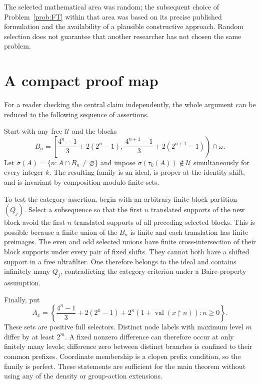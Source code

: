 \documentclass[11pt,a4paper]{article}
\theoremstyle{definition}
\theoremstyle{remark}
\newcommand{\U}{\mathcal U}
\newcommand{\supp}{\sigma}
\newcommand{\sh}[2]{\tau_{#1}(#2)}
\newcommand{\restr}{\mathbin{\upharpoonright}}
\DeclareMathOperator{\val}{val}
\begin{document}
The selected mathematical area was random; the subsequent choice of
Problem~\ref{prob:FT} within that area was based on its precise published
formulation and the availability of a plausible constructive approach.
Random selection does not guarantee that another researcher has not
chosen the same problem.

\section{A compact proof map}
\label{app:proofmap}
For a reader checking the central claim independently, the whole
argument can be reduced to the following sequence of assertions.

Start with any free $\U$ and the blocks
\[
 B_n=\left[\frac{4^n-1}{3}+2(2^n-1),\,
              \frac{4^{n+1}-1}{3}+2(2^{n+1}-1)\right)\cap\omega.
\]
Let $\supp(A)=\{n:A\cap B_n\ne\varnothing\}$ and impose
$\supp(\sh{k}{A})\notin\U$ simultaneously for every integer $k$.
The resulting family is an ideal, is proper at the identity shift,
and is invariant by composition modulo finite sets.

To test the category assertion, begin with an arbitrary finite-block
partition $(Q_j)$. Select a subsequence so that the first $n$ translated
supports of the new block avoid the first $n$ translated supports of
all preceding selected blocks. This is possible because a finite union
of the $B_n$ is finite and each translation has finite preimages. The
even and odd selected unions have finite cross-intersection of their
block supports under every pair of fixed shifts. They cannot both
have a shifted support in a free ultrafilter. One therefore belongs to
the ideal and contains infinitely many $Q_j$, contradicting the
category criterion under a Baire-property assumption.

Finally, put
\[
 A_x=\left\{
      \frac{4^n-1}{3}+2(2^n-1)+2^n(1+\val(x\restr n)):n\ge0
                         \right\}.
\]
These sets are positive full selectors. Distinct node labels with
maximum level $m$ differ by at least $2^m$. A fixed nonzero difference
can therefore occur at only finitely many levels; difference zero
between distinct branches is confined to their common prefixes.
Coordinate membership is a clopen prefix condition, so the family is
perfect. These statements are sufficient for the main theorem without
using any of the density or group-action extensions.
\end{document}
